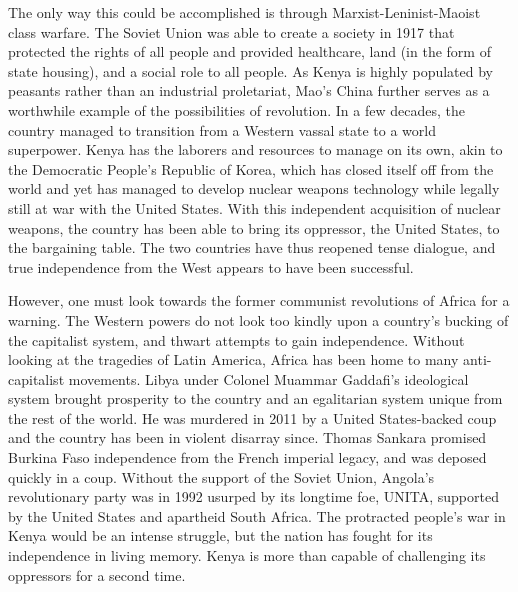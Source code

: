 \documentclass{../../../coursework}
\begin{document}
The only way this could be accomplished is through Marxist-Leninist-Maoist
class warfare. The Soviet Union was able to create a society in 1917 that
protected the rights of all people and provided healthcare, land (in the form
of state housing), and a social role to all people. As Kenya is highly
populated by peasants rather than an industrial proletariat, Mao's China
further serves as a worthwhile example of the possibilities of revolution. In
a few decades, the country managed to transition from a Western vassal state
to a world superpower. Kenya has the laborers and resources to manage on its
own, akin to the Democratic People's Republic of Korea, which has closed
itself off from the world and yet has managed to develop nuclear weapons
technology while legally still at war with the United States. With this
independent acquisition of nuclear weapons, the country has been able to bring
its oppressor, the United States, to the bargaining table. The two countries
have thus reopened tense dialogue, and true independence from the West appears
to have been successful.

However, one must look towards the former communist revolutions of Africa for
a warning. The Western powers do not look too kindly upon a country's bucking
of the capitalist system, and thwart attempts to gain independence. Without
looking at the tragedies of Latin America, Africa has been home to many
anti-capitalist movements. Libya under Colonel Muammar Gaddafi's ideological
system brought prosperity to the country and an egalitarian system unique from
the rest of the world. He was murdered in 2011 by a United States-backed coup
and the country has been in violent disarray since. Thomas Sankara promised
Burkina Faso independence from the French imperial legacy, and was deposed
quickly in a coup. Without the support of the Soviet Union, Angola's
revolutionary party was in 1992 usurped by its longtime foe, UNITA, supported
by the United States and apartheid South Africa. The protracted people's war
in Kenya would be an intense struggle, but the nation has fought for its
independence in living memory. Kenya is more than capable of challenging its
oppressors for a second time.

\printbibliography
\end{document}
